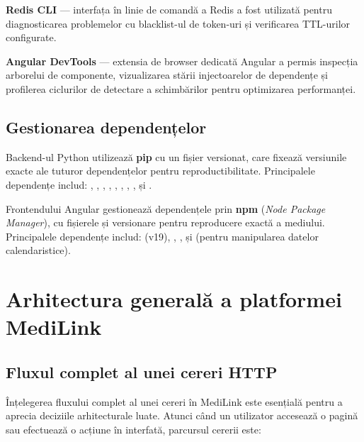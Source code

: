 \textbf{Redis CLI} --- interfața în linie de comandă a Redis a fost utilizată pentru diagnosticarea problemelor cu blacklist-ul de token-uri și verificarea TTL-urilor configurate.

\textbf{Angular DevTools} --- extensia de browser dedicată Angular a permis inspecția arborelui de componente, vizualizarea stării injectoarelor de dependențe și profilerea ciclurilor de detectare a schimbărilor pentru optimizarea performanței.

\subsection{Gestionarea dependențelor}

Backend-ul Python utilizează \textbf{pip} cu un fișier  versionat, care fixează versiunile exacte ale tuturor dependențelor pentru reproductibilitate. Principalele dependențe includ: , , , , , , , ,  și .

Frontendului Angular gestionează dependențele prin \textbf{npm} (\textit{Node Package Manager}), cu fișierele  și  versionare pentru reproducere exactă a mediului. Principalele dependențe includ:  (v19), , ,  și  (pentru manipularea datelor calendaristice).

\section{Arhitectura generală a platformei MediLink}

\subsection{Fluxul complet al unei cereri HTTP}

Înțelegerea fluxului complet al unei cereri în MediLink este esențială pentru a aprecia deciziile arhitecturale luate. Atunci când un utilizator accesează o pagină sau efectuează o acțiune în interfată, parcursul cererii este:

